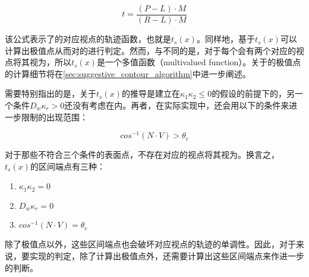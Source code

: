 \begin{equation}\label{eq:suggestive trajectory}
    t = \frac{(P-L)\cdot{M}}{(R-L)\cdot{M}}
\end{equation}

该公式表示了\scon{}的对应视点的轨迹函数，也就是$t_s(x)$。同样地，基于$t_s(x)$可以计算出极值点从而对\scon{}的\epsl{}进行判定。然而，与\con{}不同的是，对于每个\sconp{}会有两个对应的视点将其视为\sconp{}，所以$t_s(x)$是一个多值函数（multivalued function）。关于\scon{}的极值点的计算细节将在\ref{sec:suggestive_contour_algorithm}中进一步阐述。

需要特别指出的是，关于$t_s(x)$的推导是建立在$\kappa_1\kappa_2 \leq 0$的假设的前提下的，另一个条件$D_w\kappa_r>0$还没有考虑在内。再者，在实际实现中，还会用以下的条件来进一步限制\scon{}的出现范围：

\begin{equation}\label{eq:cosNdotV}
  cos^{-1}(N\cdot{V}) > \theta_c 
\end{equation}

对于那些不符合三个条件的表面点，不存在对应的视点将其视为\sconp{}。换言之，$t_s(x)$的区间端点有三种：

\begin{enumerate}
\item $\kappa_1\kappa_2 = 0$
\item $D_w\kappa_r = 0$
\item $cos^{-1}(N\cdot{V}) = \theta_c$
\end{enumerate}

除了极值点以外，这些区间端点也会破坏对应视点的轨迹的单调性。因此，对于\scon{}来说，要实现\epsl{}的判定，除了计算出极值点外，还需要计算出这些区间端点来作进一步的判断。